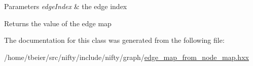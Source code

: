 \begin{DoxyParams}{Parameters}
{\em edge\+Index} & the edge index \\
\hline
\end{DoxyParams}
\begin{DoxyReturn}{Returns}
the value of the edge map 
\end{DoxyReturn}


The documentation for this class was generated from the following file\+:\begin{DoxyCompactItemize}
\item 
/home/tbeier/src/nifty/include/nifty/graph/\hyperlink{edge__map__from__node__map_8hxx}{edge\+\_\+map\+\_\+from\+\_\+node\+\_\+map.\+hxx}\end{DoxyCompactItemize}
